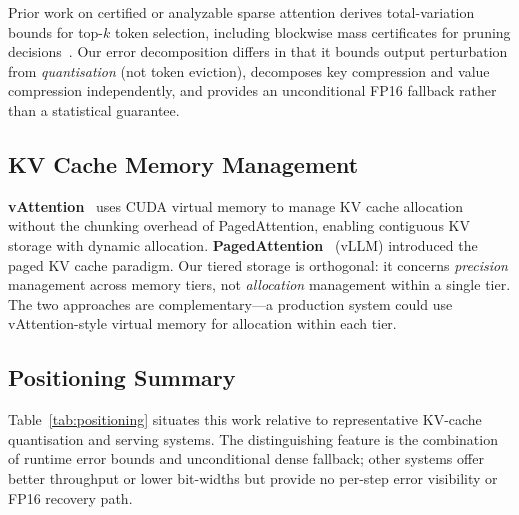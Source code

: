 \documentclass[10pt,twocolumn,a4paper]{article}
\theoremstyle{definition}
\theoremstyle{remark}
\begin{document}
Prior work on certified or analyzable sparse attention derives total-variation bounds for top-$k$ token selection, including blockwise mass certificates for pruning decisions~\cite{certifiedtopk}.  Our error decomposition differs in that it bounds output perturbation from \emph{quantisation} (not token eviction), decomposes key compression and value compression independently, and provides an unconditional FP16 fallback rather than a statistical guarantee.

\subsection{KV Cache Memory Management}

\textbf{vAttention}~\cite{vattention} uses CUDA virtual memory to manage KV cache allocation without the chunking overhead of PagedAttention, enabling contiguous KV storage with dynamic allocation.  \textbf{PagedAttention}~\cite{pagedattn} (vLLM) introduced the paged KV cache paradigm.  Our tiered storage is orthogonal: it concerns \emph{precision} management across memory tiers, not \emph{allocation} management within a single tier.  The two approaches are complementary---a production system could use vAttention-style virtual memory for allocation within each tier.

\subsection{Positioning Summary}

Table~\ref{tab:positioning} situates this work relative to representative KV-cache quantisation and serving systems.  The distinguishing feature is the combination of runtime error bounds and unconditional dense fallback; other systems offer better throughput or lower bit-widths but provide no per-step error visibility or FP16 recovery path.
\end{document}
